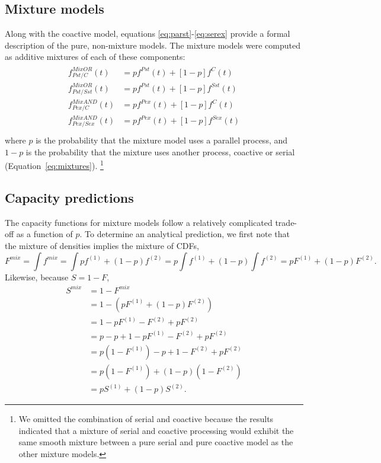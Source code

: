 \subsection{Mixture models} Along with the coactive model, equations \ref{eq:parst}-\ref{eq:serex} provide a formal description of the pure, non-mixture models. The mixture models were computed as additive mixtures of each of these components:
\begin{align} \tag{8}
\begin{split}
	f^{Mix OR}_{Pst/C}(t) &= p f^{Pst}(t) + [1-p] f^{C}(t)\\
    f^{Mix OR}_{Pst/Sst}(t) &= p f^{Pst}(t) + [1-p] f^{Sst}(t) \\
    f^{Mix AND}_{Pex/C}(t) &= p f^{Pex}(t) + [1-p] f^{C}(t)\\
    f^{Mix AND}_{Pex/Sex}(t) &= p f^{Pex}(t) + [1-p] f^{Sex}(t) \\
    \label{eq:mixtures}
\end{split}
\end{align}
\noindent
where $p$ is the probability that the mixture model uses a parallel process, and $1-p$ is the probability that the mixture uses another process, coactive or serial (Equation~\ref{eq:mixtures}). \footnote{We omitted the combination of serial and coactive because the results indicated that a mixture of serial and coactive processing would exhibit the same smooth mixture between a pure serial and pure coactive model as the other mixture models.}

\subsection{Capacity predictions} 
The capacity functions for mixture models follow a relatively complicated trade-off as a function of $p$.  To determine an analytical prediction, we first note that the mixture of densities implies the mixture of CDFs,
\begin{equation}\label{eq:Fmix} \tag{9}
F^{mix} = \int f^{mix} = \int pf^{(1)} + (1-p)f^{(2)} = p\int f^{(1)} + (1-p) \int f^{(2)} = pF^{(1)} + (1-p)F^{(2)}.
\end{equation}
Likewise, because $S=1-F$, 
\begin{align}
S^{mix} 
&= 1-F^{mix} \nonumber \\
&= 1-(pF^{(1)} + (1-p)F^{(2)}) \nonumber \\
&= 1-pF^{(1)} -F^{(2)} +pF^{(2)} \nonumber \\
&= p -p + 1-pF^{(1)} -F^{(2)} +pF^{(2)} \nonumber \\
&= p(1-F^{(1)}) -p + 1 -F^{(2)} +pF^{(2)} \nonumber \\
&= p(1-F^{(1)}) +(1-p)(1-F^{(2)}) \nonumber \\ 
&= pS^{(1)} +(1-p)S^{(2)}. \nonumber
\end{align}

